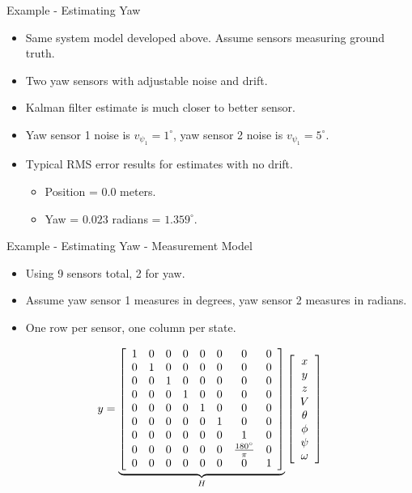 \documentclass[hyperref={pdfpagelabels=false}]{beamer}
\begin{document}
\begin{frame}{Example - Estimating Yaw}
\begin{itemize}
\item Same system model developed above. Assume sensors measuring ground truth.
\item Two yaw sensors with adjustable noise and drift.
\item Kalman filter estimate is much closer to better sensor.
\item Yaw sensor 1 noise is $v_{\psi_1} = 1^\circ$, yaw sensor 2 noise is $v_{\psi_1} = 5^\circ$.
\item Typical RMS error results for estimates with no drift.
\begin{itemize}
\item Position = $0.0$ meters.
\item Yaw = $0.023$ radians = $1.359^\circ$.
\end{itemize}
\end{itemize}
\end{frame}

\begin{frame}{Example - Estimating Yaw - Measurement Model}
\begin{itemize}
\item Using 9 sensors total, 2 for yaw.
\item Assume yaw sensor 1 measures in degrees, yaw sensor 2 measures in radians.
\item One row per sensor, one column per state.
\end{itemize}
\begin{align*}
y = \underbrace{\left[\begin{array}{c c c c c c c c}
1 & 0 & 0 & 0 & 0 & 0 & 0 & 0 \\
0 & 1 & 0 & 0 & 0 & 0 & 0 & 0 \\
0 & 0 & 1 & 0 & 0 & 0 & 0 & 0 \\
0 & 0 & 0 & 1 & 0 & 0 & 0 & 0 \\
0 & 0 & 0 & 0 & 1 & 0 & 0 & 0 \\
0 & 0 & 0 & 0 & 0 & 1 & 0 & 0 \\
0 & 0 & 0 & 0 & 0 & 0 & 1 & 0 \\
0 & 0 & 0 & 0 & 0 & 0 & \frac{180^\circ}{\pi} & 0 \\
0 & 0 & 0 & 0 & 0 & 0 & 0 & 1
\end{array}\right]}_{H}
\left[\begin{array}{c}
x \\ y \\ z \\ V \\ \theta \\ \phi \\ \psi \\ \omega
\end{array}\right]
\end{align*}
\end{frame}
\end{document}
